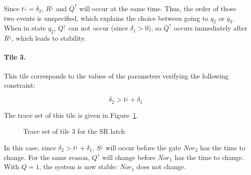 \documentclass[a4paper,11pt]{report}
\begin{document}
Since $t^\downarrow = \delta_2$, $R^\downarrow$ and $\overline{Q}^\uparrow$ will occur at the same time.
Thus, the order of those two events is unspecified, which explains the choice between going to $q_2$ or $q_3$.
When in state $q_2$, $Q^\uparrow$ can not occur (since $\delta_1 > 0$), so $\overline{Q}^\uparrow$ occurs immediately after $R^\downarrow$, which leads to stability.


\paragraph*{Tile 3.}
This tile corresponds to the values of the parameters verifying the following constraint:

$$ \delta_2 > t^\downarrow + \delta_1 $$

The trace set of this tile is given in Figure~\ref{fig:sr_tile_3}.

\begin{figure}[ht]
\centering
\footnotesize

\caption{Trace set of tile 3 for the SR latch}
\label{fig:sr_tile_3}
\end{figure}

In this case, since $\delta_2 > t^\downarrow + \delta_1 $, $S^\downarrow$ will occur before the gate $\mathit{Nor}_2$ has the time to change.
For the same reason, $Q^\uparrow$ will change before $\mathit{Nor}_1$ has the time to change.
With $Q = 1$, the system is now stable: $\mathit{Nor}_1$ does not change.
\end{document}
